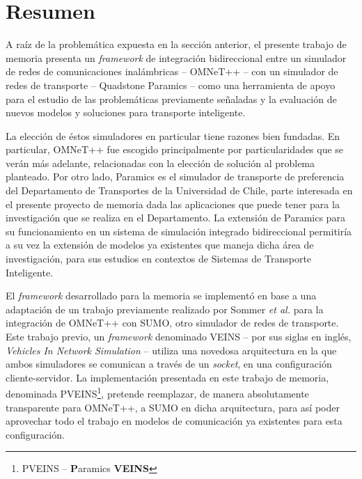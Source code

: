 \section{Resumen}

A raíz de la problemática expuesta en la sección anterior, el presente trabajo de memoria presenta un \emph{framework} de integración bidireccional entre un simulador de redes de comunicaciones inalámbricas -- OMNeT++ -- con un simulador de redes de transporte -- Quadstone Paramics -- como una herramienta de apoyo para el estudio de las problemáticas previamente señaladas y la evaluación de nuevos modelos y soluciones para transporte inteligente.

La elección de éstos simuladores en particular tiene razones bien fundadas. En particular, OMNeT++ fue escogido principalmente por particularidades que se verán más adelante, relacionadas con la elección de solución al problema planteado. Por otro lado, Paramics es el simulador de transporte de preferencia del Departamento de Transportes de la Universidad de Chile, parte interesada en el presente proyecto de memoria dada las aplicaciones que puede tener para la investigación que se realiza en el Departamento. La extensión de Paramics para su funcionamiento en un sistema de simulación integrado bidireccional permitiría a su vez la extensión de modelos ya existentes que maneja dicha área de investigación, para sus estudios en contextos de Sistemas de Transporte Inteligente.

El \emph{framework} desarrollado para la memoria se implementó en base a una adaptación de un trabajo previamente realizado por Sommer \emph{et al.} \autocite{sommer_german_dressler, sommer_dressler2} para la integración de OMNeT++ con SUMO, otro simulador de redes de transporte. Este trabajo previo, un \emph{framework} denominado VEINS -- por sus siglas en inglés, \emph{Vehicles In Network Simulation} -- utiliza una novedosa arquitectura en la que ambos simuladores se comunican a través de un \emph{socket}, en una configuración cliente-servidor. La implementación presentada en este trabajo de memoria, denominada PVEINS\footnote{PVEINS -- \textbf{P}aramics \textbf{VEINS}}, pretende reemplazar, de manera absolutamente transparente para OMNeT++, a SUMO en dicha arquitectura, para así poder aprovechar todo el trabajo en modelos de comunicación ya existentes para esta configuración.

